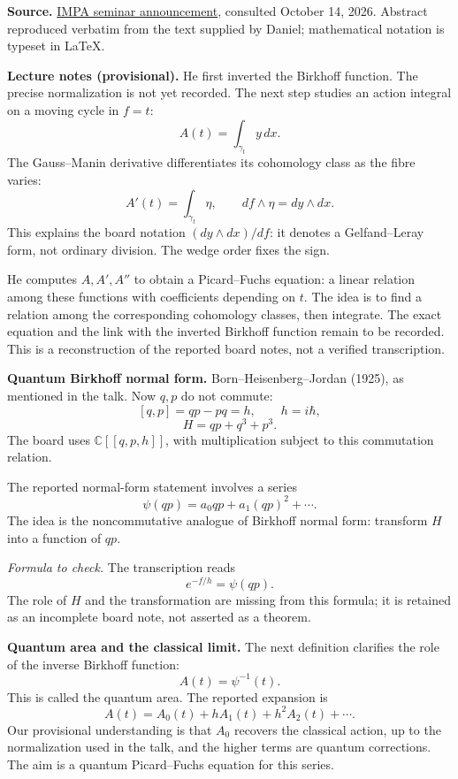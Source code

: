 \medskip\noindent
{\bf Source.}
\href{https://impa.br/seminarios/}
{IMPA seminar announcement},
consulted October 14, 2026.
Abstract reproduced verbatim from the
text supplied by Daniel; mathematical
notation is typeset in LaTeX.

\medskip\noindent
{\bf Lecture notes (provisional).}
He first inverted the Birkhoff function.
The precise normalization is not yet
recorded. The next step studies an action
integral on a moving cycle in $f=t$:
$$
A(t)=\int_{\gamma_t}y\,dx.
$$
The Gauss--Manin derivative differentiates
its cohomology class as the fibre varies:
$$
A'(t)=\int_{\gamma_t}\eta,
\qquad
df\wedge\eta=dy\wedge dx.
$$
This explains the board notation
$(dy\wedge dx)/df$: it denotes a
Gelfand--Leray form, not ordinary division.
The wedge order fixes the sign.

He computes $A,A',A''$ to obtain a
Picard--Fuchs equation: a linear relation
among these functions with coefficients
depending on $t$. The idea is to find a
relation among the corresponding
cohomology classes, then integrate.
The exact equation and the link with
the inverted Birkhoff function remain
to be recorded. This is a reconstruction
of the reported board notes, not a
verified transcription.

\medskip\noindent
{\bf Quantum Birkhoff normal form.}
Born--Heisenberg--Jordan (1925),
as mentioned in the talk.
Now $q,p$ do not commute:
$$
[q,p]=qp-pq=h,\qquad h=i\hbar,
$$
$$
H=qp+q^3+p^3.
$$
The board uses $\mathbb{C}[[q,p,h]]$,
with multiplication subject to this
commutation relation.

The reported normal-form statement
involves a series
$$
\psi(qp)=a_0qp+a_1(qp)^2+\cdots.
$$
The idea is the noncommutative analogue
of Birkhoff normal form: transform $H$
into a function of $qp$.

{\it Formula to check.}
The transcription reads
$$
e^{-f/h}=\psi(qp).
$$
The role of $H$ and the transformation
are missing from this formula; it is
retained as an incomplete board note,
not asserted as a theorem.

\medskip\noindent
{\bf Quantum area and the classical limit.}
The next definition clarifies the role
of the inverse Birkhoff function:
$$
A(t)=\psi^{-1}(t).
$$
This is called the quantum area.
The reported expansion is
$$
A(t)=A_0(t)+hA_1(t)+h^2A_2(t)+\cdots.
$$
Our provisional understanding is that
$A_0$ recovers the classical action,
up to the normalization used in the talk,
and the higher terms are quantum
corrections. The aim is a quantum
Picard--Fuchs equation for this series.

